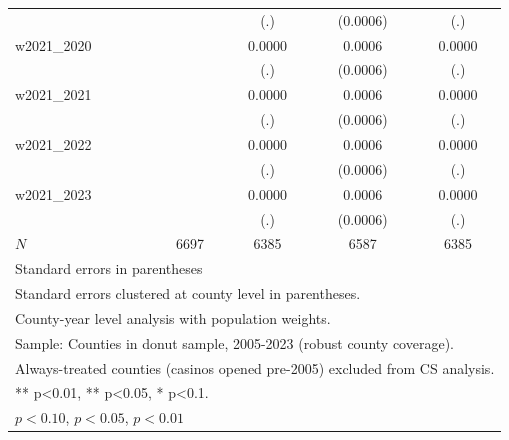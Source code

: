 \begin{table}[htbp]
\begin{tabular}{l*{4}{c}}
            &                     &         (.)         &    (0.0006)         &         (.)         \\
[1em]
w2021\_2020  &                     &      0.0000         &      0.0006         &      0.0000         \\
            &                     &         (.)         &    (0.0006)         &         (.)         \\
[1em]
w2021\_2021  &                     &      0.0000         &      0.0006         &      0.0000         \\
            &                     &         (.)         &    (0.0006)         &         (.)         \\
[1em]
w2021\_2022  &                     &      0.0000         &      0.0006         &      0.0000         \\
            &                     &         (.)         &    (0.0006)         &         (.)         \\
[1em]
w2021\_2023  &                     &      0.0000         &      0.0006         &      0.0000         \\
            &                     &         (.)         &    (0.0006)         &         (.)         \\
\hline
\(N\)       &        6697         &        6385         &        6587         &        6385         \\
\hline\hline
\multicolumn{5}{l}{\footnotesize Standard errors in parentheses}\\
\multicolumn{5}{l}{\footnotesize Standard errors clustered at county level in parentheses.}\\
\multicolumn{5}{l}{\footnotesize County-year level analysis with population weights.}\\
\multicolumn{5}{l}{\footnotesize Sample: Counties in donut sample, 2005-2023 (robust county coverage).}\\
\multicolumn{5}{l}{\footnotesize Always-treated counties (casinos opened pre-2005) excluded from CS analysis.}\\
\multicolumn{5}{l}{\footnotesize *** p<0.01, ** p<0.05, * p<0.1.}\\
\multicolumn{5}{l}{\footnotesize \sym{*} \(p<0.10\), \sym{**} \(p<0.05\), \sym{***} \(p<0.01\)}\\
\end{tabular}
\end{table}
